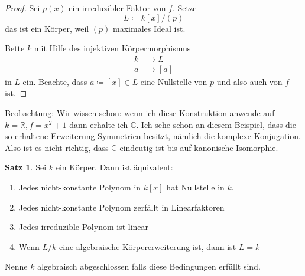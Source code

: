 \documentclass[12pt,parskip=full]{scrartcl}
\newcommand{\setR}{\mathbb{R}}
\newcommand{\setC}{\mathbb{C}}
\newcommand{\heading}{\underline}
\theoremstyle{definition}
\newtheorem{theorem}{Satz}[section]
\theoremstyle{remark}
\begin{document}
	\begin{proof}
		Sei $p(x)$ ein irreduzibler Faktor von $f$. Setze
		\begin{equation*}
			L \coloneqq k[x] / (p)
		\end{equation*}
		das ist ein Körper, weil $(p)$ maximales Ideal ist.
		
		Bette $k$ mit Hilfe des injektiven Körpermorphismus
		\begin{align*}
			k &\to L \\
			a &\mapsto [a]
		\end{align*}
		in $L$ ein. Beachte, dass $a \coloneqq [x] \in L$ eine Nullstelle von $p$ und also auch von $f$ ist.
	\end{proof}

	\heading{Beobachtung:} Wir wissen schon: wenn ich diese Konstruktion anwende auf $k = \setR, f = x^2 + 1$ dann erhalte ich $\setC$. Ich sehe schon an diesem Beispiel, dass die so erhaltene Erweiterung Symmetrien besitzt, nämlich die komplexe Konjugation. Also ist es nicht richtig, dass $\setC$ eindeutig ist bis auf kanonische Isomorphie.
	
	\begin{theorem}
		Sei $k$ ein Körper. Dann ist äquivalent:
		\begin{enumerate}
			\item Jedes nicht-konstante Polynom in $k[x]$ hat Nullstelle in $k$.
			\item Jedes nicht-konstante Polynom zerfällt in Linearfaktoren
			\item Jedes irreduzible Polynom ist linear
			\item Wenn $L/k$ eine algebraische Körpererweiterung ist, dann ist $L = k$
		\end{enumerate}
		Nenne $k$ algebraisch abgeschlossen falls diese Bedingungen erfüllt sind.
	\end{theorem}
\end{document}

